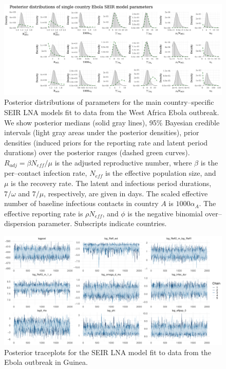 \begin{figure}
	\begin{fullpage}
		\centering
		\includegraphics[width=\linewidth]{figures/ebola_single_posts}
		\caption[Posterior distributions of parameters of the main country--specific SEIR LNA models fit to data from the West Africa Ebola outbreak.]{Posterior distributions of parameters for the main country--specific SEIR LNA models fit to data from the West Africa Ebola outbreak. We show posterior medians (solid gray lines), 95\% Bayesian credible intervals (light gray areas under the posterior densities), prior densities (induced priors for the reporting rate and latent period durations) over the posterior ranges (dashed green curves). $ R_{adj} = \beta N_{eff}/\mu $ is the adjusted reproductive number, where $ \beta $ is the per--contact infection rate, $ N_{eff} $ is the effective population size, and $ \mu $ is the recovery rate. The latent and infectious period durations, $ 7/\omega $ and $ 7/\mu $, respectively, are given in days. The scaled effective number of baseline infectious contacts in country $ A $ is $ 1000\alpha_{A} $. The effective reporting rate is $ \rho N_{eff} $, and $ \phi $ is the negative binomial over--dispersion parameter. Subscripts indicate countries.}
		\label{fig:ebola_single_posts}
	\end{fullpage}
\end{figure}

\begin{figure}
	\centering
	\includegraphics[width=\linewidth]{figures/guin_tight_traces}
	\caption{Posterior traceplots for the SEIR LNA model fit to data from the Ebola outbreak in Guinea.}
	\label{fig:guineatraces}
\end{figure}

